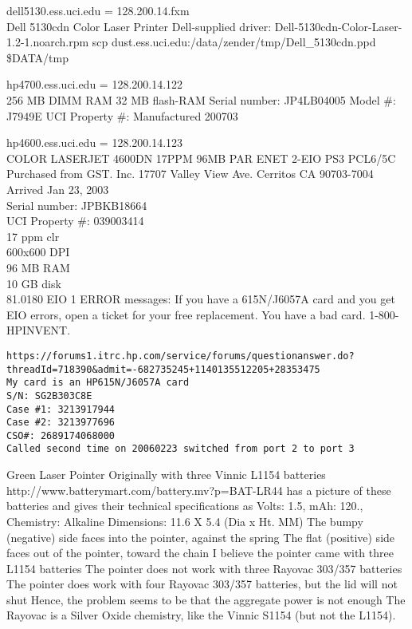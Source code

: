 \documentclass[12pt,twoside]{article}
\begin{document}
dell5130.ess.uci.edu = 128.200.14.fxm \\
Dell 5130cdn Color Laser Printer
Dell-supplied driver:
Dell-5130cdn-Color-Laser-1.2-1.noarch.rpm
scp dust.ess.uci.edu:/data/zender/tmp/Dell\_5130cdn.ppd \${DATA}/tmp

hp4700.ess.uci.edu = 128.200.14.122 \\
256 MB DIMM RAM
32 MB flash-RAM
Serial number: JP4LB04005
Model \#: J7949E
UCI Property \#: 
Manufactured 200703

hp4600.ess.uci.edu = 128.200.14.123 \\
COLOR LASERJET 4600DN 17PPM 96MB PAR ENET 2-EIO PS3 PCL6/5C \\
Purchased from GST. Inc.
17707 Valley View Ave.
Cerritos CA 90703-7004
Arrived Jan 23, 2003 \\
Serial number: JPBKB18664 \\
UCI Property \#: 039003414 \\
17 ppm clr\\ 
600x600 DPI\\
96 MB RAM\\
10 GB disk\\
81.0180 EIO 1 ERROR messages:
If you have a 615N/J6057A card and you get EIO errors, open a ticket
for your free replacement. You have a bad card.
1-800-HPINVENT.
\begin{verbatim}
https://forums1.itrc.hp.com/service/forums/questionanswer.do?threadId=718390&admit=-682735245+1140135512205+28353475
My card is an HP615N/J6057A card 
S/N: SG2B303C8E
Case #1: 3213917944
Case #2: 3213977696
CSO#: 2689174068000
Called second time on 20060223 switched from port 2 to port 3
\end{verbatim}

Green Laser Pointer
Originally with three Vinnic L1154 batteries
http://www.batterymart.com/battery.mv?p=BAT-LR44
has a picture of these batteries and gives their technical specifications as 
Volts: 1.5, mAh: 120., Chemistry: Alkaline
Dimensions: 11.6 X 5.4 (Dia x Ht. MM)
The bumpy (negative) side faces into the pointer, against the spring
The flat (positive) side faces out of the pointer, toward the chain
I believe the pointer came with three L1154 batteries
The pointer does not work with three Rayovac 303/357 batteries
The pointer does work with four Rayovac 303/357 batteries, but the lid will not shut
Hence, the problem seems to be that the aggregate power is not enough
The Rayovac is a Silver Oxide chemistry, like the Vinnic S1154
(but not the L1154).
\end{document}
